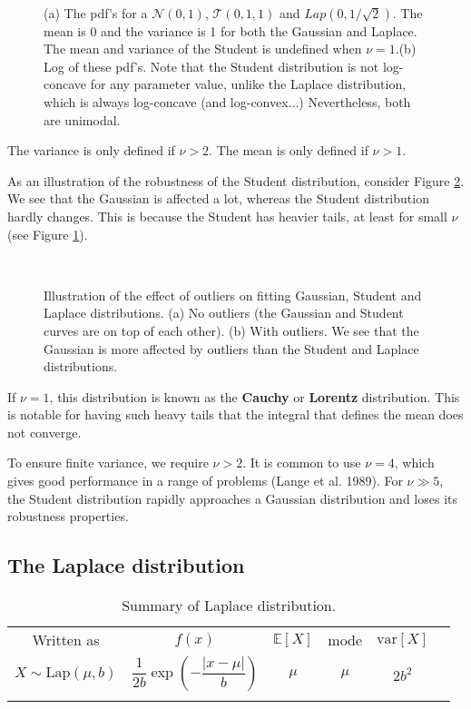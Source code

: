 \begin{figure}[hbtp]
\centering
{} \\
\caption{(a) The pdf’s for a $\mathcal{N}(0,1)$, $\mathcal{T}(0,1,1)$ and $Lap(0,1/\sqrt{2})$. The mean is 0 and the variance is 1 for both the Gaussian and Laplace. The mean and variance of the Student is undefined when $\nu=1$.(b) Log of these pdf’s. Note that the Student distribution is not log-concave for any parameter value, unlike the Laplace distribution, which is always log-concave (and log-convex...) Nevertheless, both are unimodal.}
\label{fig:pdfs-for-NTL} 
\end{figure}

The variance is only defined if $\nu>2$. The mean is only defined if $\nu>1$.

As an illustration of the robustness of the Student distribution, consider Figure \ref{fig:robustness}. We see that the Gaussian is affected a lot, whereas the Student distribution hardly changes. This is because the Student has heavier tails, at least for small $\nu$(see Figure \ref{fig:pdfs-for-NTL}).

\begin{figure}[hbtp]
\centering
{} \\
\caption{Illustration of the effect of outliers on fitting Gaussian, Student and Laplace distributions. (a) No outliers (the Gaussian and Student curves are on top of each other). (b) With outliers. We see that the Gaussian is more affected by outliers than the Student and Laplace distributions.}
\label{fig:robustness} 
\end{figure}

If $\nu=1$, this distribution is known as the \textbf{Cauchy} or \textbf{Lorentz} distribution. This is notable for having such heavy tails that the integral that defines the mean does not converge.

To ensure finite variance, we require $\nu>2$. It is common to use $\nu=4$, which gives good performance in a range of problems (Lange et al. 1989). For $\nu \gg 5$, the Student distribution rapidly approaches a Gaussian distribution and loses its robustness properties.


\subsection{The Laplace distribution}
\begin{table}
\caption{Summary of Laplace distribution.}
\centering
\begin{tabular}{cccccc}
\hline\noalign{\smallskip}
Written as & $f(x)$ & $\mathbb{E}[X]$ & mode & $\text{var}[X]$ \\
\noalign{\smallskip}\svhline\noalign{\smallskip}
$X \sim \text{Lap}(\mu,b)$ & $\dfrac{1}{2b}\exp\left(-\dfrac{|x-\mu|}{b}\right)$ & $\mu$ & $\mu$ & $2b^2$ \\
\noalign{\smallskip}\hline
\end{tabular}
\end{table}

